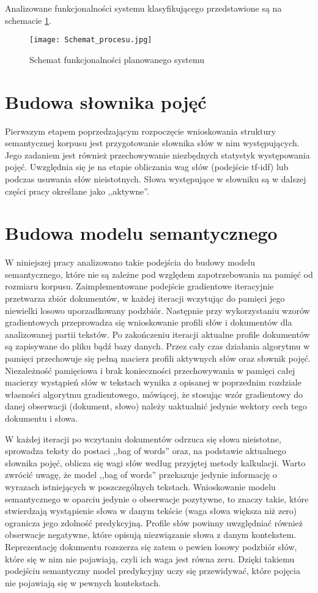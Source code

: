 \documentclass{pracamgr}
\begin{document}
Analizowane funkcjonalności systemu klasyfikującego przedstawione są na schemacie \ref{classification_approach}.

\begin{figure}
    \centering
    \texttt{[image: Schemat\_procesu.jpg]}
    \caption{Schemat funkcjonalności planowanego systemu}
    \label{classification_approach}
\end{figure}

\section{Budowa słownika pojęć}
Pierwszym etapem poprzedzającym rozpoczęcie wnioskowania struktury semantycznej korpusu jest przygotowanie słownika słów w nim występujących. Jego zadaniem jest również przechowywanie niezbędnych statystyk występowania pojęć. Uwzględnia się je na etapie obliczania wag słów (podejście tf-idf) lub podczas usuwania słów nieistotnych. Słowa występujące w słowniku są w dalszej części pracy określane jako ,,aktywne''.

\section{Budowa modelu semantycznego}
W niniejszej pracy analizowano takie podejścia do budowy modelu semantycznego, które nie są zależne pod względem zapotrzebowania na pamięć od rozmiaru korpusu. Zaimplementowane podejście gradientowe iteracyjnie przetwarza zbiór dokumentów, w każdej iteracji wczytując do pamięci jego niewielki losowo uporzadkowany podzbiór. Następnie przy wykorzystaniu wzorów gradientowych przeprowadza się wnioskowanie profili słów i dokumentów dla analizowanej partii tekstów. Po zakończeniu iteracji aktualne profile dokumentów są zapisywane do pliku bądź bazy danych. Przez cały czas działania algorytmu w pamięci przechowuje się pełną macierz profili aktywnych słów oraz słownik pojęć. Niezależność pamięciowa i brak konieczności przechowywania w pamięci całej macierzy wystąpień słów w tekstach wynika z opisanej w poprzednim rozdziale własności algorytmu gradientowego, mówiącej, że stosując wzór gradientowy do danej obserwacji (dokument, słowo) należy uaktualnić jedynie wektory cech tego dokumentu i słowa.

W każdej iteracji po wczytaniu dokumentów odrzuca się słowa nieistotne, sprowadza teksty do postaci ,,bag of words'' oraz, na podstawie aktualnego słownika pojęć, oblicza się wagi słów według przyjętej metody kalkulacji. Warto zwrócić uwagę, że model ,,bag of words'' przekazuje jedynie informację o wyrazach istniejących w poszczególnych tekstach. Wnioskowanie modelu semantycznego w oparciu jedynie o obserwacje pozytywne, to znaczy takie, które stwierdzają wystąpienie słowa w danym tekście (waga słowa większa niż zero) ogranicza jego zdolność predykcyjną. Profile słów powinny uwzględniać również obserwacje negatywne, które opisują niezwiązanie słowa z danym kontekstem. Reprezentację dokumentu rozszerza się zatem o pewien losowy podzbiór słów, które się w nim nie pojawiają, czyli ich waga jest równa zeru. Dzięki takiemu podejściu semantyczny model predykcyjny uczy się przewidywać, które pojęcia nie pojawiają się w pewnych kontekstach.
\end{document}

